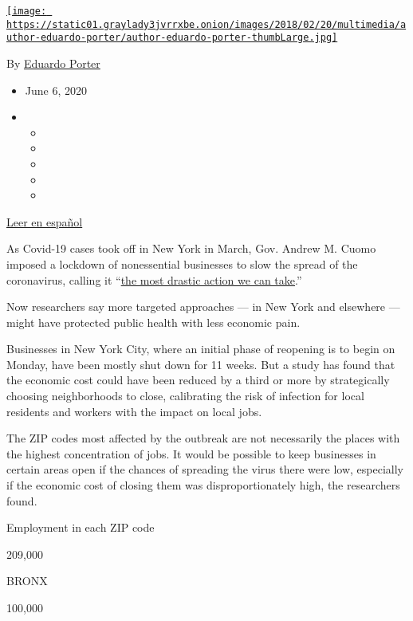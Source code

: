 \href{https://www.nytimes3xbfgragh.onion/by/eduardo-porter}{\texttt{[image: https://static01.graylady3jvrrxbe.onion/images/2018/02/20/multimedia/author-eduardo-porter/author-eduardo-porter-thumbLarge.jpg]}}

By \href{https://www.nytimes3xbfgragh.onion/by/eduardo-porter}{Eduardo
Porter}

\begin{itemize}
\item
  June 6, 2020
\item
  \begin{itemize}
  \item
  \item
  \item
  \item
  \item
  \end{itemize}
\end{itemize}

\href{https://www.nytimes3xbfgragh.onion/es/2020/06/08/espanol/negocios/economia-coronavirus-cierres.html}{Leer
en español}

As Covid-19 cases took off in New York in March, Gov. Andrew M. Cuomo
imposed a lockdown of nonessential businesses to slow the spread of the
coronavirus, calling it
``\href{https://www.nytimes3xbfgragh.onion/2020/03/20/us/ny-ca-stay-home-order.html}{the
most drastic action we can take}.''

Now researchers say more targeted approaches --- in New York and
elsewhere --- might have protected public health with less economic
pain.

Businesses in New York City, where an initial phase of reopening is to
begin on Monday, have been mostly shut down for 11 weeks. But a study
has found that the economic cost could have been reduced by a third or
more by strategically choosing neighborhoods to close, calibrating the
risk of infection for local residents and workers with the impact on
local jobs.

The ZIP codes most affected by the outbreak are not necessarily the
places with the highest concentration of jobs. It would be possible to
keep businesses in certain areas open if the chances of spreading the
virus there were low, especially if the economic cost of closing them
was disproportionately high, the researchers found.

Employment in each ZIP code

209,000

BRONX

100,000

